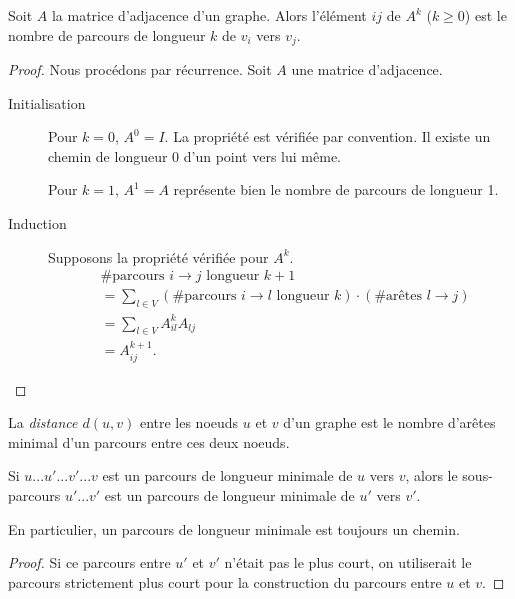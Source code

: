 \begin{mytheo} 
  Soit $A$ la matrice d'adjacence d'un graphe. Alors l'élément $ij$ de $A^k$ ($k \geq 0$) est le nombre de parcours de longueur $k$ de $v_i$ vers $v_j$.
  \begin{proof}
    Nous procédons par récurrence. Soit $A$ une matrice d'adjacence.
    \begin{description}
      \item[Initialisation]
        Pour $k=0$, $A^{0}=I$. La propriété est vérifiée par convention. Il existe un chemin de longueur 0 d'un point vers lui même.

        Pour $k=1$, $A^{1}=A$ représente bien le nombre de parcours de longueur 1.
      \item[Induction]
        Supposons la propriété vérifiée pour $A^{k}$.
        \begin{align*}
          &\#\text{parcours $i \to j$ longueur }k+1\\
          & = \sum_{l \in V} (\# \text{parcours }i \to l\text{ longueur }k) \cdot (\# \text{arêtes } l \to j)\\
          & = \sum_{l \in V} A_{il}^{k}A_{lj}\\
          & = A_{ij}^{k+1}.
        \end{align*}
    \end{description}
  \end{proof}
\end{mytheo}

\begin{mydef}
  La \emph{distance $d(u, v)$} entre les noeuds $u$ et $v$ d'un graphe est le nombre d'arêtes minimal d'un parcours entre ces deux noeuds.
\end{mydef}

\begin{mylem}
  Si $u...u'...v'...v$ est un parcours de longueur minimale de $u$ vers $v$, alors le sous-parcours $u'...v'$ est un parcours de longueur minimale de $u'$ vers $v'$.

  En particulier, un parcours de longueur minimale est toujours un chemin.
  \begin{proof}
    Si ce parcours entre $u'$ et $v'$ n'était pas le plus court, on utiliserait le parcours strictement plus court pour la construction du parcours entre $u$ et $v$.
  \end{proof}
\end{mylem}

